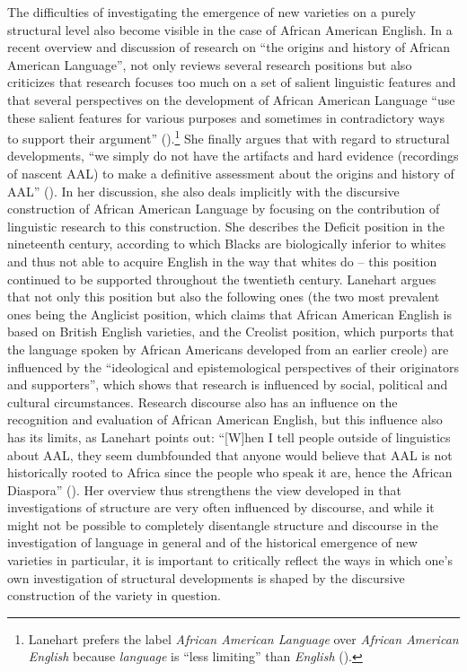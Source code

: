 The difficulties of investigating the emergence of new varieties on a purely structural level also become visible in the case of African American English. In a recent overview and discussion of research on “the origins and history of African American Language”, \citet{Lanehart2017} not only reviews several research positions but also criticizes that research focuses too much on a set of salient linguistic features and that several perspectives on the development of African American Language “use these salient features for various purposes and sometimes in contradictory ways to support their argument” (\citeyear[86]{Lanehart2017}).\footnote{Lanehart prefers the label \textit{African American Language} over \textit{African American English} because \textit{language} is “less limiting” than \textit{English} (\citeyear[86]{Lanehart2017}).} She finally argues that with regard to structural developments, “we simply do not have the artifacts and hard evidence (recordings of nascent AAL) to make a definitive assessment about the origins and history of AAL” (\citeyear[91]{Lanehart2017}). In her discussion, she also deals implicitly with the discursive construction of African American Language by focusing on the contribution of linguistic research to this construction. She describes the Deficit position in the nineteenth century, according to which Blacks are biologically inferior to whites and thus not able to acquire English in the way that whites do – this position continued to be supported throughout the twentieth century. Lanehart argues that not only this position but also the following ones (the two most prevalent ones being the Anglicist position, which claims that African American English is based on British English varieties, and the Creolist position, which purports that the language spoken by African Americans developed from an earlier creole) are influenced by the “ideological and epistemological perspectives of their originators and supporters”, which shows that research is influenced by social, political and cultural circumstances. Research discourse also has an influence on the recognition and evaluation of African American English, but this influence also has its limits, as Lanehart points out: “[W]hen I tell people outside of linguistics about AAL, they seem dumbfounded that anyone would believe that AAL is not historically rooted to Africa since the people who speak it are, hence the African Diaspora” (\citeyear[92]{Lanehart2017}). Her overview thus strengthens the view developed in  that investigations of structure are very often influenced by discourse, and while it might not be possible to completely disentangle structure and discourse in the investigation of language in general and of the historical emergence of new varieties in particular, it is important to critically reflect the ways in which one’s own investigation of structural developments is shaped by the discursive construction of the variety in question.

